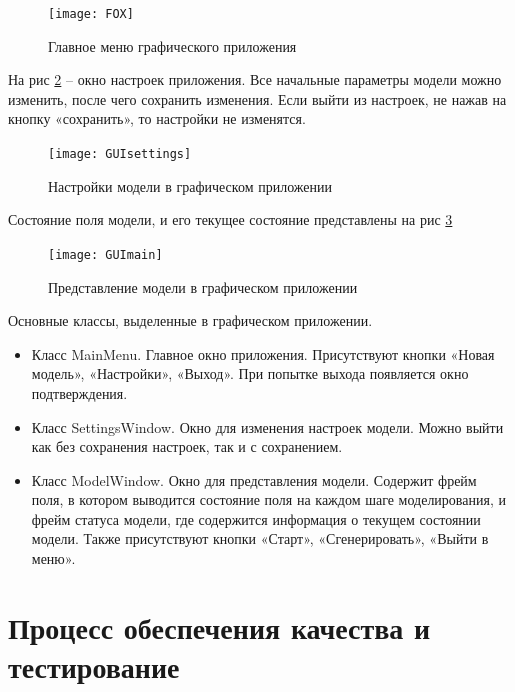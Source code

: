 \documentclass[a4paper]{article}
\begin{document}
\begin{figure}[H]
	\begin{center}
		\texttt{[image: FOX]}
		\caption{Главное меню графического приложения} 
		\label{pic:FOX} %
	\end{center}
\end{figure}

На рис \ref{pic:GUIsettings} – окно настроек приложения. Все начальные параметры модели можно изменить, после чего сохранить изменения. Если выйти из настроек, не нажав на кнопку «сохранить», то настройки не изменятся.

\begin{figure}[H]
	\begin{center}
		\texttt{[image: GUIsettings]}
		\caption{Настройки модели в графическом приложении} 
		\label{pic:GUIsettings} %
	\end{center}
\end{figure}

Состояние поля модели, и его текущее состояние представлены на рис \ref{pic:GUImain} 

\begin{figure}[H]
	\begin{center}
		\texttt{[image: GUImain]}
		\caption{Представление модели в графическом приложении} 
		\label{pic:GUImain} %
	\end{center}
\end{figure}

\noindent Основные классы, выделенные в графическом приложении. 
\begin{itemize}
\item Класс MainMenu. Главное окно приложения. Присутствуют кнопки «Новая модель», «Настройки», «Выход». При попытке выхода появляется окно подтверждения. 
\item Класс SettingsWindow. Окно для изменения настроек модели. Можно выйти как без сохранения настроек, так и с сохранением. 
\item Класс ModelWindow. Окно для представления модели. Содержит фрейм поля, в котором выводится состояние поля на каждом шаге моделирования, и фрейм статуса модели, где содержится информация о текущем состоянии модели. Также присутствуют кнопки «Старт», «Сгенерировать», «Выйти в меню».  
\end{itemize}

\section{Процесс обеспечения качества и тестирование}
\end{document}
